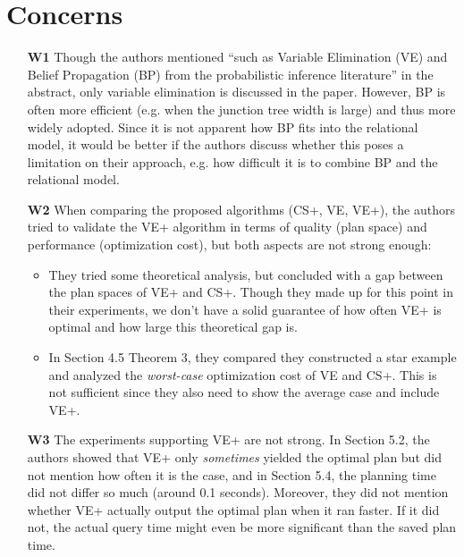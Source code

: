\documentclass[a4paper]{article}
\begin{document}
\section*{Concerns}
\begin{itemize}
\item[\textbf{W1}] 
Though the authors mentioned ``such as Variable Elimination (VE) and Belief Propagation (BP) from the probabilistic inference literature'' in the abstract, only variable elimination is discussed in the paper. However, BP is often more efficient (e.g. when the junction tree width is large) and thus more widely adopted. Since it is not apparent how BP fits into the relational model, it would be better if the authors discuss whether this poses a limitation on their approach, e.g. how difficult it is to combine BP and the relational model.

\item[\textbf{W2}]
When comparing the proposed algorithms (CS+, VE, VE+), the authors tried to validate the VE+ algorithm in terms of quality (plan space) and performance (optimization cost), but both aspects are not strong enough:
\begin{itemize}
\item They tried some theoretical analysis, but concluded with a gap between the plan spaces of VE+ and CS+. Though they made up for this point in their experiments, we don't have a solid guarantee of how often VE+ is optimal and how large this theoretical gap is.
\item In Section 4.5 Theorem 3, they compared they constructed a star example and analyzed the \emph{worst-case} optimization cost of VE and CS+. This is not sufficient since they also need to show the average case and include VE+.
\end{itemize}

\item[\textbf{W3}]
The experiments supporting VE+ are not strong. In Section 5.2, the authors showed that VE+ only \emph{sometimes} yielded the optimal plan but did not mention how often it is the case, and in Section 5.4, the planning time did not differ so much (around 0.1 seconds). Moreover, they did not mention whether VE+ actually output the optimal plan when it ran faster. If it did not, the actual query time might even be more significant than the saved plan time.
\end{itemize}
\end{document}
